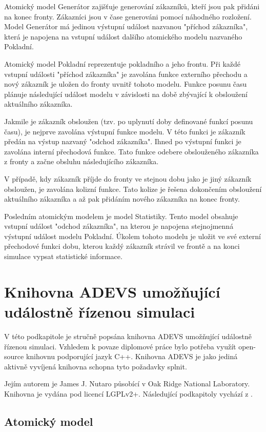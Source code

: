 Atomický model Generátor zajišťuje generování zákazníků, kteří jsou pak přidáni na konec fronty. Zákazníci jsou v čase generováni pomocí náhodného rozložení. Model Generátor má jedinou výstupní událost nazvanou "příchod zákazníka", která je napojena na vstupní událost dalšího atomického modelu nazvaného Pokladní.

Atomický model Pokladní reprezentuje pokladního a jeho frontu. Při každé vstupní události "příchod zákazníka" je zavolána funkce externího přechodu a nový zákazník je uložen do fronty uvnitř tohoto modelu. Funkce posunu času plánuje následující událost modelu v závislosti na době zbývající k obsloužení aktuálního zákazníka.

Jakmile je zákazník obsloužen (tzv. po uplynutí doby definované funkcí posunu času), je nejprve zavolána výstupní funkce modelu. V této funkci je zákazník předán na výstup nazvaný "odchod zákazníka". Ihned po výstupní funkci je zavolána interní přechodová funkce. Tato funkce odebere obslouženého zákazníka z fronty a začne obsluhu následujícího zákazníka.

V případě, kdy zákazník příjde do fronty ve stejnou dobu jako je jiný zákazník obsloužen, je zavolána kolizní funkce. Tato kolize je řešena dokončením obsloužení aktuálního zákazníka a až pak přidáním nového zákazníka na konec fronty.

Posledním atomickým modelem je model Statistiky. Tento model obsahuje vstupní událost "odchod zákazníka", na kterou je napojena stejnojmenná výstupní událost modelu Pokladní. Úkolem tohoto modelu je uložit ve své externí přechodové funkci dobu, kterou každý zákazník strávil ve frontě a na konci simulace vypsat statistické informace.

\section{Knihovna ADEVS umožňující událostně řízenou simulaci}

V této podkapitole je stručně popsána knihovna ADEVS umožňující událostně řízenou simulaci. Vzhledem k povaze diplomové práce bylo potřeba využít open-source knihovnu podporující jazyk C++. Knihovna ADEVS je jako jediná aktivně vyvíjená knihovna schopna tyto požadavky splnit.

Jejím autorem je James J. Nutaro působící v Oak Ridge National Laboratory. Knihovna je vydána pod licencí LGPLv2+. Následující podkapitoly vychází z \cite{adevs}.

\subsection{Atomický model}

